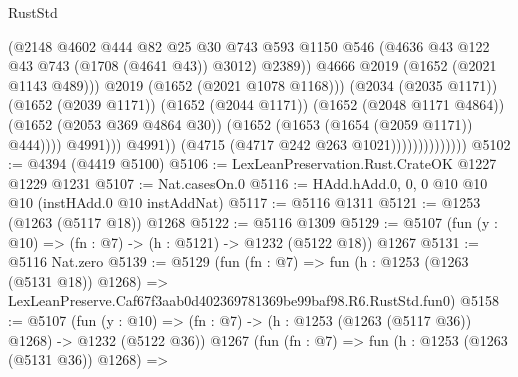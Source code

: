 \begin{lexlean}{RustStd}
\begin{coremodule}
                                                (@2148
                                                  @4602
                                                  @444
                                                  @82
                                                  @25
                                                  @30
                                                  @743
                                                  @593
                                                  @1150
                                                  @546
                                                  (@4636
                                                    @43
                                                    @122
                                                    @43
                                                    @743
                                                    (@1708 (@4641 @43))
                                                    @3012)
                                                  @2389))
                                              @4666
                                              @2019
                                              (@1652 (@2021 @1143 @489)))
                                            @2019
                                            (@1652 (@2021 @1078 @1168)))
                                          (@2034 (@2035 @1171))
                                          (@1652 (@2039 @1171))
                                          (@1652 (@2044 @1171))
                                          (@1652 (@2048 @1171 @4864))
                                          (@1652 (@2053 @369 @4864 @30))
                                          (@1652 (@1653 (@1654 (@2059 @1171)) @444))))
                                      @4991)))
                                @4991))
                            (@4715 (@4717 @242 @263 @1021))))))))))))))
@5102 := @4394 (@4419 @5100)
@5106 := LexLeanPreservation.Rust.CrateOK @1227 @1229 @1231
@5107 := Nat.casesOn.{0}
@5116 := HAdd.hAdd.{0, 0, 0} @10 @10 @10 (instHAdd.{0} @10 instAddNat)
@5117 := @5116 @1311
@5121 := @1253 (@1263 (@5117 @18)) @1268
@5122 := @5116 @1309
@5129 := @5107 (fun (y : @10) => (fn : @7) -> (h : @5121) -> @1232 (@5122 @18)) @1267
@5131 := @5116 Nat.zero
@5139 := @5129
    (fun (fn : @7) =>
    fun (h : @1253 (@1263 (@5131 @18)) @1268) =>
    LexLeanPreserve.Caf67f3aab0d402369781369be99baf98.R6.RustStd.fun0)
@5158 := @5107
    (fun (y : @10) => (fn : @7) -> (h : @1253 (@1263 (@5117 @36)) @1268) -> @1232 (@5122 @36))
    @1267
    (fun (fn : @7) =>
    fun (h : @1253 (@1263 (@5131 @36)) @1268) =>

\end{coremodule}
\end{lexlean}
